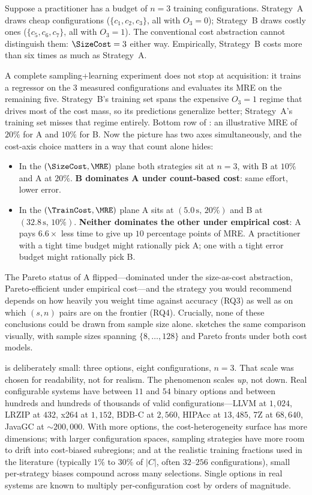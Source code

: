 \noindent
Suppose a practitioner has a budget of $n=3$ training configurations.
Strategy~A draws cheap configurations ($\{c_1,c_2,c_3\}$, all with
$O_3=0$); Strategy~B draws costly ones ($\{c_5,c_6,c_7\}$, all with
$O_3=1$). The conventional cost abstraction cannot distinguish them:
$\SizeCost=3$ either way. Empirically, Strategy~B costs more than six
times as much as Strategy~A.

A complete sampling+learning experiment does not stop at acquisition: it
trains a regressor on the $3$ measured configurations and evaluates its
MRE on the remaining five. Strategy~B's training set spans the expensive
$O_3=1$ regime that drives most of the cost mass, so its predictions
generalize better; Strategy~A's training set misses that regime
entirely. Bottom row of : an illustrative MRE
of $20\%$ for A and $10\%$ for B. Now the picture has two axes
simultaneously, and the cost-axis choice matters in a way that count
alone hides:
\begin{itemize}
    \item In the $(\SizeCost, \MRE)$ plane both strategies sit at $n=3$,
    with B at $10\%$ and A at $20\%$. \textbf{B dominates A under
    count-based cost}: same effort, lower error.
    \item In the $(\TrainCost, \MRE)$ plane A sits at $(5.0\,\mathrm{s},\,
    20\%)$ and B at $(32.8\,\mathrm{s},\, 10\%)$. \textbf{Neither
    dominates the other under empirical cost}: A pays $6.6\times$ less
    time to give up $10$ percentage points of MRE. A practitioner with a
    tight time budget might rationally pick A; one with a tight error
    budget might rationally pick B.
\end{itemize}
The Pareto status of A flipped---dominated under the size-as-cost
abstraction, Pareto-efficient under empirical cost---and the strategy you
would recommend depends on how heavily you weight time against accuracy
(RQ3) as well as on which $(s,n)$ pairs are on the frontier (RQ4).
Crucially, none of these conclusions could be drawn from sample size
alone.  sketches the same comparison
visually, with sample sizes spanning $\{8,\ldots,128\}$ and Pareto fronts
under both cost models.

 is deliberately small: three options, eight
configurations, $n=3$. That scale was chosen for readability, not for
realism. The phenomenon scales \emph{up}, not down. Real configurable
systems have between $11$ and $54$ binary options and between hundreds
and hundreds of thousands of valid configurations---LLVM at $1{,}024$,
LRZIP at $432$, x264 at $1{,}152$, BDB-C at $2{,}560$, HIPAcc at
$13{,}485$, 7Z at $68{,}640$, JavaGC at $\sim\!\!200{,}000$. With more
options, the cost-heterogeneity surface has more dimensions; with larger
configuration spaces, sampling strategies have more room to drift into
cost-biased subregions; and at the realistic training fractions used in
the literature (typically $1\%$ to $30\%$ of $|C|$, often $32$--$256$
configurations), small per-strategy biases compound across many
selections. Single options in real systems are known to multiply
per-configuration cost by orders of magnitude.


